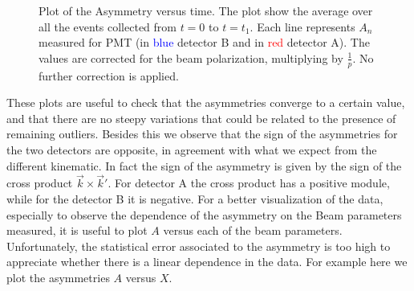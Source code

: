 \begin{figure}[hbtp]
\centering

\caption{Plot of the Asymmetry versus time. The plot show the average over all the events collected from $t = 0$ to $t = t_{1}$. Each line represents $A_{n}$ measured for  PMT (in \textcolor{blue}{blue} detector B and in \textcolor{red}{red} detector A). The values are corrected for the beam polarization, multiplying by $\frac{1}{p}$. No further correction is applied.}
\label{fig:AsymOverTime}
\end{figure}

These plots are useful to check that the asymmetries converge to a certain value, and that there are no steepy variations that could be related to the presence of remaining outliers. Besides this we observe that the sign of the asymmetries for the two detectors are opposite, in agreement with what we expect from the different kinematic. In fact the sign of the asymmetry is given by the sign of the cross product $\vec{k} \times \vec{k}'$. For detector A the cross product has a positive module, while for the detector B it is negative.
For a better visualization of the data, especially to observe the dependence of the asymmetry on the Beam parameters measured, it is useful to plot $A$ versus each of the beam parameters. Unfortunately, the statistical error associated to the asymmetry is too high to appreciate whether there is a linear dependence in the data. For example here we plot the asymmetries $A$ versus $X$.


